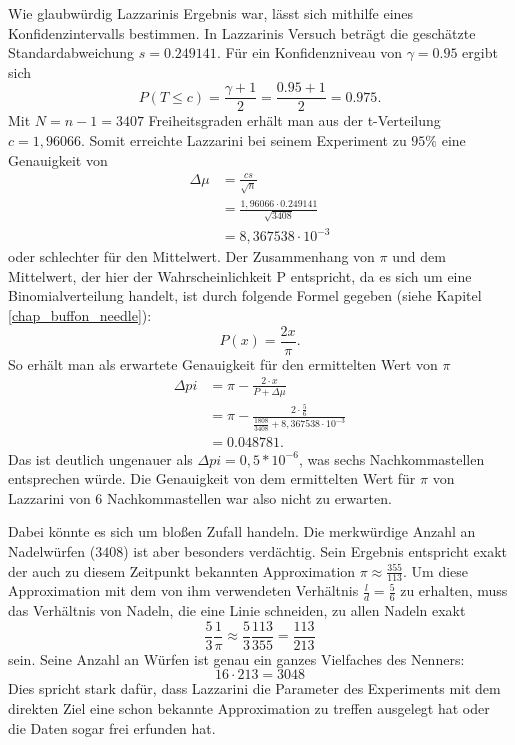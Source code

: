 \documentclass[10pt,twocolumn]{scrartcl}
\begin{document}
	Wie glaubwürdig Lazzarinis Ergebnis war, lässt sich mithilfe eines Konfidenzintervalls bestimmen.
	In Lazzarinis Versuch beträgt die geschätzte Standardabweichung $s = 0.249141$.
	Für ein Konfidenzniveau von $\gamma = 0.95$ ergibt sich
	\begin{equation}
	P(T \le c) = \frac{\gamma + 1}{2} = \frac{0.95 + 1}{2} = 0.975 .
	\end{equation}
	Mit $N = n - 1 = 3407$ Freiheitsgraden erhält man aus der t-Verteilung $c = 1,96066$.
	Somit erreichte Lazzarini bei seinem Experiment zu $95\%$ eine Genauigkeit von
	\begin{align}
	\Delta \mu &= \frac{cs}{\sqrt{n}} \\
	&= \frac{1,96066 \cdot 0.249141}{\sqrt{3408}} \\ \nonumber
	&= 8,367538 \cdot 10 ^{-3} \nonumber
	\end{align}
	oder schlechter für den Mittelwert. Der Zusammenhang von $\pi$ und dem Mittelwert, der hier der Wahrscheinlichkeit P entspricht, da es sich um eine Binomialverteilung handelt, ist durch folgende Formel gegeben (siehe Kapitel \ref{chap_buffon_needle}):
	\begin{equation}
	P(x) = \frac{2x}{\pi}.
	\end{equation}
	So erhält man als erwartete Genauigkeit für den ermittelten Wert von $\pi$
	\begin{align}
	\Delta pi &= \pi - \frac{2 \cdot x}{P + \Delta \mu} \\
	&= \pi - \frac{2 \cdot \frac{5}{6}}{\frac{1808}{3408} + 8,367538 \cdot 10 ^{-3}} \\ \nonumber
	&= 0.048781 \nonumber .
	\end{align}
	Das ist deutlich ungenauer als $\Delta pi = 0,5 * 10^{-6}$, was sechs Nachkommastellen entsprechen würde.
	Die Genauigkeit von dem ermittelten Wert für $\pi$ von Lazzarini von 6 Nachkommastellen war also nicht zu erwarten.
	
	Dabei könnte es sich um bloßen Zufall handeln. Die merkwürdige Anzahl an Nadelwürfen ($3408$) ist aber besonders verdächtig. Sein Ergebnis entspricht exakt der auch zu diesem Zeitpunkt bekannten Approximation $\pi \approx \frac{355}{113}$.
	Um diese Approximation mit dem von ihm verwendeten Verhältnis ${\tfrac {l}{d}={\tfrac {5}{6}}}$ zu erhalten, muss das Verhältnis von Nadeln, die eine Linie schneiden, zu allen Nadeln exakt
	\begin{equation}
	\frac{5}{3} \frac{1}{\pi}  \approx \frac{5}{3} \frac{113}{355} = \frac{113}{213}
	\end{equation}
	sein.
	Seine Anzahl an Würfen ist genau ein ganzes Vielfaches des Nenners:
	\begin{equation}
	16 \cdot 213 = 3048
	\end{equation}
	Dies spricht stark dafür, dass Lazzarini die Parameter des Experiments mit dem direkten Ziel eine schon bekannte Approximation zu treffen ausgelegt hat oder die Daten sogar frei erfunden hat. \cite{Badger}
	
\end{document}
